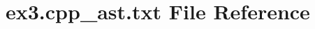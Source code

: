 \hypertarget{ex3_8cpp__ast_8txt}{}\section{ex3.\+cpp\+\_\+ast.\+txt File Reference}
\label{ex3_8cpp__ast_8txt}
